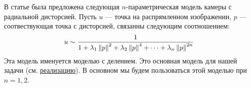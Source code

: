 
В статье \cite{Fitzgibbon01b} была предложена следующая $n$-параметрическая модель камеры с радиальной дисторсией. Пусть $u$ --- точка на распрямленном изображении, $p$ --- соотвествующая точка с дисторсией, связанны следующим соотношением:
\begin{equation}
	u \sim \frac{1}{1 + \lambda_1\left\lVert p\right\rVert^2 + \lambda_2\left\lVert p\right\rVert^4 + \cdots + \lambda_n\left\lVert p\right\rVert^{2n}}
\end{equation} 
Эта модель именуется моделью с делением. Это основная модель для нашей задачи (см. \href{https://github.com/QuantumMechanicus/camera_calibration/blob/dev/core/scene/Intrinsics.h}{реализацию}). В основном мы будем пользоваться этой моделью при $n = 1, 2$.

